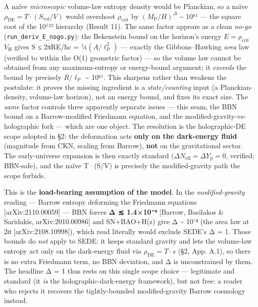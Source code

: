 \documentclass[
  10pt,
]{article}
\begin{document}
A naïve \emph{microscopic} volume-law entropy density would be
Planckian, so a naïve
\(\rho _{\mathrm{DE}} = T\cdot (S_{\mathrm{vol}}/V)\) would overshoot
\(\rho _{\mathrm{crit}}\) by \((M_{\mathrm{P}}/H)^{\Delta }\)
\textasciitilde{} 10⁶¹ --- the square root of the 10¹²² hierarchy
(Result 11). The same factor appears as a clean \emph{no-go}
(\texttt{run\_deriv\_E\_nogo.py}): the Bekenstein bound on the horizon's
energy \(E = \rho _{\mathrm{crit}}\) \(V_{\mathrm{H}}\) gives S ≤
2πRE/ħc = ¼\((A/\ell _{\mathrm{P}}^{2})\) --- exactly the
Gibbons--Hawking \emph{area} law (verified to within the O(1) geometric
factor) --- so the volume law cannot be obtained from any
maximum-entropy or energy-bound argument; it \emph{exceeds} the bound by
precisely \(R/\ell _{\mathrm{P}}\) \textasciitilde{} 10⁶¹. This sharpens
rather than weakens the postulate: it proves the missing ingredient is a
\emph{state/counting} input (a Planckian-density, volume-law horizon),
not an energy bound, and fixes its exact size. The \emph{same} factor
controls three apparently separate issues --- this seam, the BBN bound
on a Barrow-modified Friedmann equation, and the
modified-gravity-vs-holographic fork --- which are one object. The
resolution is the holographic-DE scope adopted in §2: the deformation
acts \textbf{only on the dark-energy fluid} (magnitude from CKN, scaling
from Barrow), \textbf{not} on the gravitational sector. The
early-universe expansion is then exactly standard
\((\Delta N_{\mathrm{eff}} = \Delta Y_{\mathrm{p}} = 0\), verified;
BBN-safe), and the naïve T·(S/V) is precisely the modified-gravity path
the scope forbids.

This is the \textbf{load-bearing assumption of the model}. In the
\emph{modified-gravity} reading --- Barrow entropy deforming the
Friedmann equations {[}arXiv:2110.00059{]} --- BBN forces \textbf{Δ ≲
1.4×10⁻⁴} {[}Barrow, Basilakos \& Saridakis, arXiv:2010.00986{]} and
SN+BAO+H(z) give Δ \textasciitilde{} 10⁻⁴ (the area law at 2σ
{[}arXiv:2108.10998{]}), which read literally would exclude SEDE's Δ =
1. Those bounds do \emph{not} apply to SEDE: it keeps standard gravity
and lets the volume-law entropy act only on the dark-energy fluid via
\(\rho _{\mathrm{DE}} = T\cdot s\) (§2, App. A.1), so there is no extra
Friedmann term, no BBN deviation, and Δ is unconstrained by them. The
headline Δ = 1 thus rests on this single scope choice --- legitimate and
standard (it \emph{is} the holographic-dark-energy framework), but not
free: a reader who rejects it recovers the tightly-bounded
modified-gravity Barrow cosmology instead.
\end{document}

